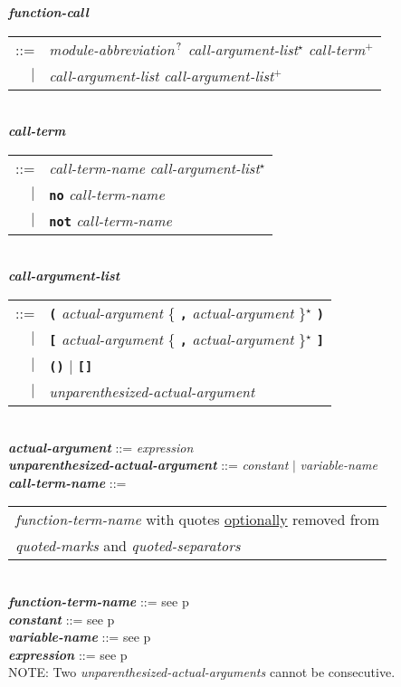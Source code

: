 \documentclass[12pt]{article}
\newcommand{\TT}[1]{{\tt \bfseries #1}}
\newcommand{\STAR}{{\Large $^\star$}}
\newcommand{\PLUS}[1][]{{$^{+#1}$}}
\newcommand{\QMARK}{{$^{\,\mbox{\footnotesize ?}}$}}
\newcommand{\ttkey}[1]{{\tt \bfseries #1}}
\newcommand{\emkey}[1]{{\em \bfseries #1}}
\newcommand{\pagref}[1]{p\pageref{#1}}
\newenvironment{indpar}[1][0.3in]%
	{\begin{list}{}%
		     {\setlength{\itemsep}{0in}%
		      \setlength{\topsep}{0in}%
		      \setlength{\parsep}{1ex}%
		      \setlength{\labelwidth}{#1}%
		      \setlength{\leftmargin}{#1}%
		      \addtolength{\leftmargin}{\labelsep}}%
	 \item}%
	{\end{list}}
\begin{document}
\begin{indpar}
\emkey{function-call}\label{FUNCTION-CALL}
    \begin{tabular}[t]{rl}
    ::= & {\em module-abbreviation}\QMARK{}
          {\em call-argument-list}\STAR{}
          {\em call-term}\PLUS{} \\
    $|$ & {\em call-argument-list}
          {\em call-argument-list}\PLUS{} \\
    \end{tabular}
\\[0.5ex]
\emkey{call-term}
    \begin{tabular}[t]{rl}
    ::= & {\em call-term-name} {\em call-argument-list}\STAR{} \\
    $|$ & \ttkey{no} {\em call-term-name} \\
    $|$ & \ttkey{not} {\em call-term-name} \\
    \end{tabular}
\\[0.5ex]
\emkey{call-argument-list}\label{CALL-ARGUMENT-LIST}
    \begin{tabular}[t]{rl}
    ::= & \TT{(} {\em actual-argument}
          \{ \TT{,} {\em actual-argument} \}\STAR{} \TT{)} \\
    $|$ & \TT{[} {\em actual-argument}
          \{ \TT{,} {\em actual-argument} \}\STAR{} \TT{]} \\
    $|$ & \TT{()} $|$ \TT{[]} \\
    $|$ & {\em unparenthesized-actual-argument} \\
    \end{tabular}
\\[0.5ex]
\emkey{actual-argument} ::= {\em expression}
\\[0.5ex]
\emkey{unparenthesized-actual-argument} ::=
    {\em constant} $|$ {\em variable-name}
\\[0.5ex]
\emkey{call-term-name}\label{CALL-TERM-NAME} ::=
    \begin{tabular}[t]{@{}l}
    {\em function-term-name} with quotes \underline{optionally} removed from \\
    {\em quoted-marks} and {\em quoted-separators}
    \end{tabular}
\\[0.5ex]
\emkey{function-term-name} ::= see \pagref{FUNCTION-TERM-NAME}
\\[0.5ex]
\emkey{constant} ::= see \pagref{CONSTANTS}
\\[0.5ex]
\emkey{variable-name} ::= see \pagref{VARIABLE-NAME}
\\[0.5ex]
\emkey{expression} ::= see \pagref{EXPRESSION}
\\[2.0ex]
NOTE: Two {\em unparenthesized-actual-arguments} cannot be consecutive.
\end{indpar}
\end{document}
